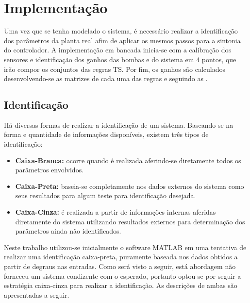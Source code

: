 %

\chapter{Implementação} \label{capImp}
Uma vez que se tenha modelado o sistema, é necessário realizar a identificação dos parâmetros da planta real afim de aplicar os mesmos passos para a sintonia do controlador. A implementação em bancada inicia-se com a calibração dos sensores e identificação dos ganhos das bombas e do sistema em 4 pontos, que irão compor os conjuntos das regras TS. Por fim, os ganhos são calculados desenvolvendo-se as matrizes de cada uma das regras e seguindo as .

\section{Identificação}
Há diversas formas de realizar a identificação de um sistema. Baseando-se na forma e quantidade de informações disponíveis, existem três tipos de identificação:
\begin{itemize}
	\item \textbf{Caixa-Branca:} ocorre quando é realizada aferindo-se diretamente todos os parâmetros envolvidos.
	\item \textbf{Caixa-Preta:} baseia-se completamente nos dados externos do sistema como seus resultados para algum teste para identificação desejada.
	\item \textbf{Caixa-Cinza:} é realizada a partir de informações internas aferidas diretamente do sistema utilizando resultados externos para determinação dos parâmetros ainda não identificados.
\end{itemize}

Neste trabalho utilizou-se inicialmente o software MATLAB em uma tentativa de realizar uma identificação caixa-preta, puramente baseada nos dados obtidos a partir de degraus nas entradas. Como será visto a seguir, está abordagem não forneceu um sistema condizente com o esperado, portanto optou-se por seguir a estratégia caixa-cinza para realizar a identificação. As descrições de ambas são apresentadas a seguir.

